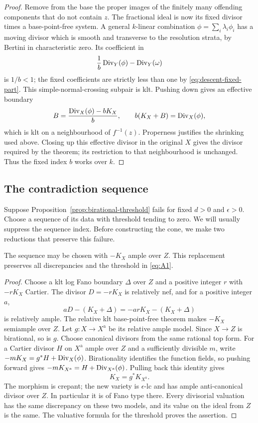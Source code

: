 \begin{proof}
Remove from the base the proper images of the finitely many offending
components that do not contain $z$. The fractional ideal is now its fixed
divisor times a base-point-free system. A general $k$-linear combination
$\phi=\sum_i\lambda_i\phi_i$ has a moving divisor which is smooth and
transverse to the resolution strata, by Bertini in characteristic zero.
Its coefficient in
\[
 \frac{1}{b}\operatorname{Div}_Y(\phi)-\operatorname{Div}_Y(\omega)
\]
is $1/b<1$; the fixed coefficients are strictly less than one by
\eqref{eq:descent-fixed-part}. This simple-normal-crossing subpair is klt.
Pushing down gives an effective boundary
\[
 B=\frac{\operatorname{Div}_X(\phi)-bK_X}{b},
 \qquad b(K_X+B)=\operatorname{Div}_X(\phi),
\]
which is klt on a neighbourhood of $f^{-1}(z)$. Properness justifies the
shrinking used above. Closing up this effective divisor in the original $X$
gives the divisor required by the theorem; its restriction to that
neighbourhood is unchanged. Thus the fixed index $b$ works over $k$.
\end{proof}

\subsection{The contradiction sequence}
\label{subsec:contradiction-sequence}

Suppose Proposition~\ref{prop:birational-threshold} fails for fixed
$d>0$ and $\epsilon>0$. Choose a sequence of its data with threshold tending
to zero. We will usually suppress the sequence index. Before constructing
the cone, we make two reductions that preserve this failure.

\begin{lemma}\label{lem:ample-model}
The sequence may be chosen with $-K_X$ ample over $Z$. This replacement
preserves all discrepancies and the threshold in \eqref{eq:A1}.
\end{lemma}

\begin{proof}
Choose a klt log Fano boundary $\Delta$ over $Z$ and a positive integer $r$
with $-rK_X$ Cartier. The divisor $D=-rK_X$ is relatively nef, and for a
positive integer $a$,
\[
 aD-(K_X+\Delta)=-arK_X-(K_X+\Delta)
\]
is relatively ample. The relative klt base-point-free theorem
\cite[Theorem~1.3]{FujinoBPF} makes $-K_X$ semiample over $Z$. Let
$g\colon X\to X^{\mathrm a}$ be its relative ample model. Since $X\to Z$
is birational, so is $g$. Choose canonical divisors from the same rational top form. For a Cartier divisor $H$ on $X^{\mathrm a}$ ample over $Z$ and a sufficiently divisible $m$, write
$-mK_X=g^*H+\operatorname{Div}_X(\phi)$. Birationality identifies the function fields, so
pushing forward gives $-mK_{X^{\mathrm a}}=H+\operatorname{Div}_{X^{\mathrm a}}(\phi)$.
Pulling back this identity gives
\[
 K_X=g^*K_{X^{\mathrm a}}.
\]
The morphism is crepant; the new variety is $\epsilon$-lc and has ample
anti-canonical divisor over $Z$. In particular it is of Fano type there.
Every divisorial valuation has the same discrepancy on these two models,
and its value on the ideal from $Z$ is the same. The valuative formula for
the threshold proves the assertion.
\end{proof}

